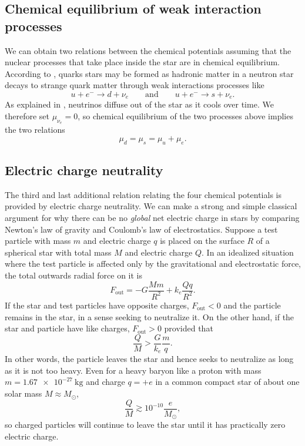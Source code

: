 \subsection{Chemical equilibrium of weak interaction processes}

We can obtain two relations between the chemical potentials assuming that the nuclear processes that take place inside the star are in chemical equilibrium.
According to \cite{ref:quark_star_processes}, quarks stars may be formed as hadronic matter in a neutron star decays to strange quark matter through weak interactions processes like
\begin{equation}
u + e^- \rightarrow d + \nu_e
\qquad \text{and} \qquad
u + e^- \rightarrow s + \nu_e .
\end{equation}
As explained in \cite[section 5.3]{ref:glendenning}, neutrinos diffuse out of the star as it cools over time.
We therefore set $\mu_{\nu_e}=0$, so chemical equilibrium of the two processes above implies the two relations
\begin{equation}
\mu_d = \mu_s = \mu_u + \mu_e .
\label{eq:lsm:chemical_equilibrium}
\end{equation}

\subsection{Electric charge neutrality}

The third and last additional relation relating the four chemical potentials is provided by electric charge neutrality.
We can make a strong and simple classical argument for why there can be no \emph{global} net electric charge in stars by comparing Newton's law of gravity and Coulomb's law of electrostatics.
Suppose a test particle with mass $m$ and electric charge $q$
is placed on the surface $R$ of a spherical star with total mass $M$ and electric charge $Q$.
In an idealized situation where the test particle is affected only by the gravitational and electrostatic force, the total outwards radial force on it is
\begin{equation}
F_\text{out} = -G \frac{M m}{R^2} + k_e \frac{Q q}{R^2} .
\end{equation}
If the star and test particles have opposite charges, $F_\text{out} < 0$ and the particle remains in the star, in a sense seeking to neutralize it.
On the other hand, if the star and particle have like charges, $F_\text{out} > 0$ provided that
\begin{equation}
\frac{Q}{M} > \frac{G}{k_e} \frac{m}{q}.
\end{equation}
In other words, the particle leaves the star and hence seeks to neutralize as long as it is not too heavy.
Even for a heavy baryon like a proton with mass $m = \SI{1.67e-27}{\kilogram}$ and charge $q = +e$ in a common compact star of about one solar mass $M \approx M_\odot$,
\begin{equation}
\frac{Q}{M} \gtrsim 10^{-10} \frac{e}{M_\odot},
\end{equation}
so charged particles will continue to leave the star until it has practically zero electric charge.


